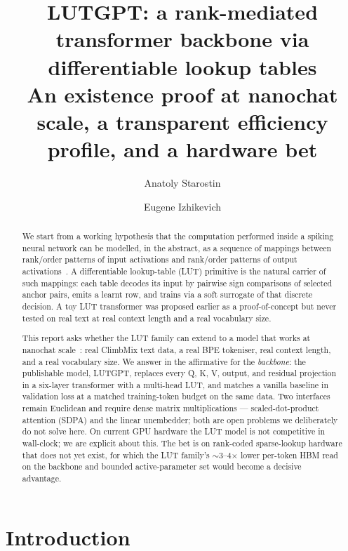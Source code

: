 \documentclass[11pt]{article}
\title{\Large\textbf{LUTGPT: a rank-mediated transformer backbone via differentiable lookup tables}\\[3pt]
\large An existence proof at nanochat scale, a transparent efficiency profile, and a hardware bet}
\author{Anatoly Starostin \and Eugene Izhikevich}
\date{}
\begin{document}
\maketitle
\vspace{-12pt}

\begin{abstract}
\noindent
We start from a working hypothesis that the computation performed inside a spiking neural network can be modelled, in the abstract, as a sequence of mappings between rank/order patterns of input activations and rank/order patterns of output activations~\citep{manifesto}. A differentiable lookup-table (LUT) primitive is the natural carrier of such mappings: each table decodes its input by pairwise sign comparisons of selected anchor pairs, emits a learnt row, and trains via a soft surrogate of that discrete decision. A toy LUT transformer was proposed earlier as a proof-of-concept but never tested on real text at real context length and a real vocabulary size.

This report asks whether the LUT family can extend to a model that works at nanochat scale~\citep{karpathy_nanochat}: real ClimbMix text data, a real BPE tokeniser, real context length, and a real vocabulary size. We answer in the affirmative for the \emph{backbone}: the publishable model, LUTGPT, replaces every Q, K, V, output, and residual projection in a six-layer transformer with a multi-head LUT, and matches a vanilla baseline in validation loss at a matched training-token budget on the same data. Two interfaces remain Euclidean and require dense matrix multiplications --- scaled-dot-product attention (SDPA) and the linear unembedder; both are open problems we deliberately do not solve here. On current GPU hardware the LUT model is not competitive in wall-clock; we are explicit about this. The bet is on rank-coded sparse-lookup hardware that does not yet exist, for which the LUT family's $\sim$3--4$\times$ lower per-token HBM read on the backbone and bounded active-parameter set would become a decisive advantage.
\end{abstract}

\vspace{6pt}

\section{Introduction}
\end{document}
